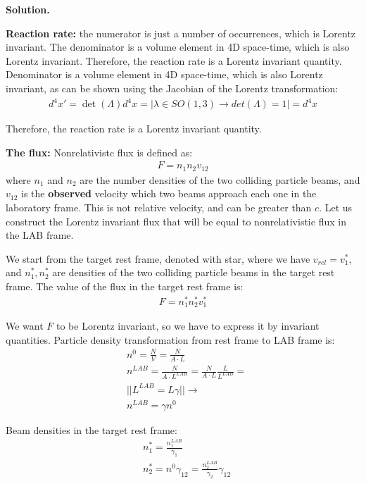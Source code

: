 \documentclass[11pt,a4paper]{article}
\newenvironment{solution}{\vspace{1cm} \par\textbf{Solution.} \vspace{1cm}}{\newpage}
\begin{document}
\begin{solution}

{\bf Reaction rate:} the numerator is just a number of occurrences, which is Lorentz invariant. The denominator is a volume element in 4D space-time, which is also Lorentz invariant. Therefore, the reaction rate is a Lorentz invariant quantity.
Denominator is a volume element in 4D space-time, which is also Lorentz invariant, 
as can be shown using the Jacobian of the Lorentz transformation: 
\begin{align*}
  d^{4}x' = \det(\Lambda) d^{4}x = | \lambda \in SO(1, 3)  \to det(\Lambda)=1 | = d^{4}x
\end{align*}

Therefore, the reaction rate is a Lorentz invariant quantity.

\vspace{1cm}

{\bf The flux:}
Nonrelativistc flux is defined as:
\begin{align*}
  F = n_{1} n_{2} v_{12}
\end{align*}
where $n_{1}$ and $n_{2}$ are the number densities of the two colliding particle beams, 
and $v_{12}$ is the {\bf observed} velocity which two beams approach each one in the laboratory frame. 
This is not relative velocity, and can be greater than $c$. Let us construct the Lorentz invariant flux that will be equal to nonrelativistic flux 
in the LAB frame.

We start from the target rest frame, denoted with star, where 
we have $v_{rel} = v_{1}^{*}$, and $n_{1}^{*}, n_{2}^{*}$ are densities of the two colliding particle beams in the target rest frame.
The value of the flux in the target rest frame is:
\begin{align*}
  F = n_{1}^{*} n_{2}^{*} v_{1}^{*}
\end{align*}

We want $F$ to be Lorentz invariant, so we have to express it by invariant quantities.
Particle density transformation from rest frame to LAB frame is:
\begin{align*}
  & n^{0} = \frac{N}{V} = \frac{N}{A \cdot L} \\
  & n^{LAB} = \frac{N}{A \cdot L^{LAB}} = \frac{N}{A \cdot L} \frac{L}{L^{LAB}} = \\
  & || L^{LAB} = L \gamma || \to \\
  & n^{LAB} = \gamma n^{0}
\end{align*}

Beam densities in the target rest frame:
\begin{align*}
  & n_{1}^{*} = \frac{n_{1}^{LAB}}{\gamma_{1}} \\
  & n_{2}^{*} = n^{0} \gamma_{12} = \frac{n_{2}^{LAB}}{\gamma_{2}} \gamma_{12} 
\end{align*}


\end{solution}
\end{document}
